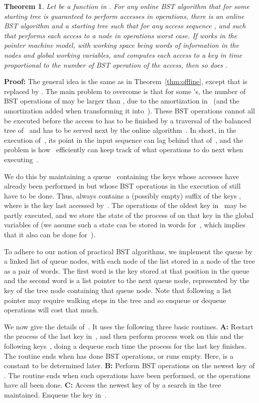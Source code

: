 \documentclass[11pt]{article}
\newtheorem{theorem}{Theorem}
\newenvironment{proof}{\noindent\textbf{Proof: }\ignorespaces}
  {\hspace*{\fill}\medskip}
\begin{document}
\begin{theorem}\label{thm:online}
Let  be a function in . For any online BST algorithm
 that for some starting tree  is guaranteed to perform  accesses
in  operations, there is an online BST algorithm
 and a starting tree  such that  for
any access sequence , and such that  performs each access to a
node in  operations worst case.
If  works in the pointer machine model, with working space being 
words of information in the nodes and  global working variables, and
computes each access to a key in time proportional to the number of BST
operation of the access, then so does .
\end{theorem}
\begin{proof}
The general idea is the same as in Theorem~\ref{thm:offline}, except
that  is replaced by .
The main problem to overcome is that for some 's, the number of BST
operations of  may be larger than , due to the amortization
in~ (and the amortization added when transforming it into~). These
BST operations cannot all be executed before the access to  has to be
finished by a traversal of the balanced tree of~ and  has to
be served next by the online algorithm~. In short, in the execution
of~, its point in the input sequence can lag behind that of~,
and the problem is how~ efficiently can keep track of what
operations to do next when executing~.

We do this by maintaining a queue~ containing the keys whose accesses
have already been performed in  but whose BST operations in the
execution of  still have to be done. Thus,  always contains a
(possibly empty) suffix of the keys , where  is the
key last accessed by~. The  operations of the oldest key in~
may be partly executed, and we store the state of the process of  on
that key in the global variables of  (we assume such a state can be
stored in  words for~, which implies that it also can be done
for~).

To adhere to our notion of practical BST algorithms, we implement the
queue by a linked list of queue nodes, with each node of the list stored in a node of
the tree as a pair of words. The first word is the key stored at that
position in the queue and the second word is a list pointer to the next
queue node, represented by the key of the tree node containing
that queue node.  Note that following a list pointer may require walking
 steps in the tree and so enqueue or dequeue operations will
cost that much.

We now give the details of~. It uses the following three basic
routines.
\textbf{A:} Restart the  process of the last key in~, and then
perform  process work on this and the following keys~, doing a
dequeue each time the process for the last key finishes. The routine
ends when  has done  BST operations, or  runs
empty. Here,  is a constant to be determined later.
\textbf{B:} Perform  BST operations on the newest key of . The
routine ends when  such operations have been performed, or the
operations have all been done.
\textbf{C:} Access the newest key of  by a search in the tree
maintained. Enqueue the key in~.


\end{proof}
\end{document}
